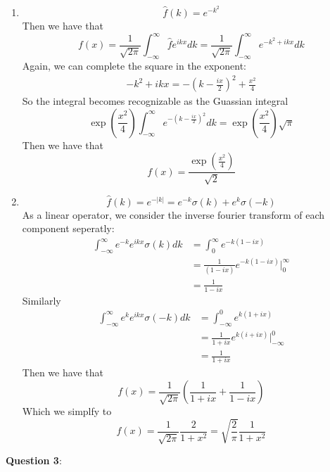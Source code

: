 \documentclass{article} %
\newcommand{\question}[2][]{
  \begin{flushleft}
    \textbf{Question #1}: \textit{#2}

\end{flushleft}}
\begin{document}
\begin{enumerate}
  \item
    \[
      \hat f(k) = e^{-k^2}
    \]
    Then we have that
    \[
      f(x) = \frac{1}{\sqrt{2\pi}}\int_{-\infty}^\infty \hat f e^{ikx}dk
      = \frac{1}{\sqrt{2\pi}}\int_{-\infty}^\infty e^{-k^2 + ikx}dk
    \]
    Again, we can complete the square in the exponent:
    \begin{align*}
      -k^2 + ikx = -(k - \frac{ix}{2})^2 + \frac{x^2}{4}
    \end{align*}
    So the integral becomes recognizable as the Guassian integral
    \[
      \exp\left(\frac{x^2}{4}\right) \int_{-\infty}^\infty
      e^{-(k-\frac{ix}{2})^2} dk = \exp(\frac{x^2}{4})\sqrt{\pi}
    \]
    Then we have that
    $$
    f(x) = \frac{\exp\left(\frac{x^2}{4}\right)}{\sqrt{2}}
    $$
  \item
    \[
      \hat f(k) = e^{-|k|} = e^{-k}\sigma(k) + e^{k}\sigma(-k)
    \]
    As a linear operator, we consider the inverse fourier transform
    of each component seperatly:
    \begin{align*}
      \int_{-\infty}^\infty e^{-k}e^{ikx}\sigma(k) dk &=
      \int_0^\infty e^{-k(1 - ix)} \\
      &= \frac{1}{(1-ix)}e^{-k(1-ix)}\Big\vert_0^\infty \\
      &= \frac{1}{1-ix}
    \end{align*}
    Similarly
    \begin{align*}
      \int_{-\infty}^\infty e^{k}e^{ikx}\sigma(-k) dk &=
      \int_{-\infty}^0 e^{k(1+ix)} \\
      &= \frac{1}{1+ix}e^{k(i+ix)}\Big\vert_{-\infty}^0 \\
      &= \frac{1}{1+ix}
    \end{align*}
    Then we have that
    $$
    f(x) = \frac{1}{\sqrt{2\pi}}\left(\frac{1}{1+ix} + \frac{1}{1-ix}\right)
    $$
    Which we simplfy to
    \[
      f(x) = \frac{1}{\sqrt{2\pi}}\frac{2}{1+x^2} =
      \sqrt{\frac{2}{\pi}}\frac{1}{1+x^2}
    \]
\end{enumerate}
\question[3]{}
\end{document}
